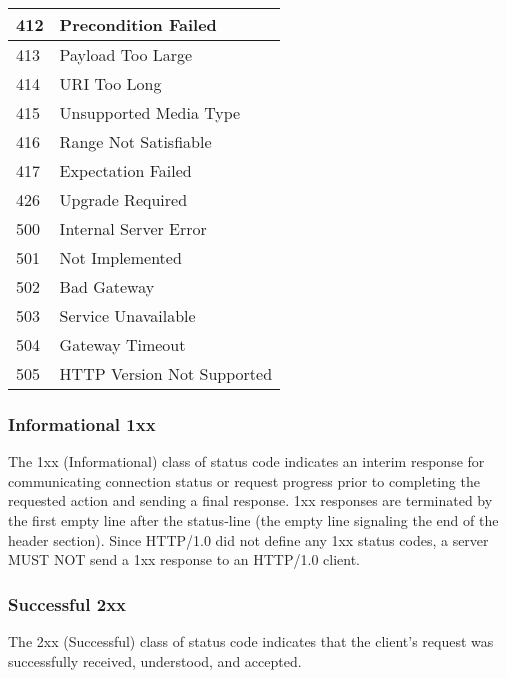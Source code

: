 \begin{longtable}{|l|l|}
   \\ \hline 412  & Precondition Failed           
   \\ \hline 413  & Payload Too Large             
   \\ \hline 414  & URI Too Long                  
   \\ \hline 415  & Unsupported Media Type        
   \\ \hline 416  & Range Not Satisfiable         
   \\ \hline 417  & Expectation Failed            
   \\ \hline 426  & Upgrade Required              
   \\ \hline 500  & Internal Server Error         
   \\ \hline 501  & Not Implemented               
   \\ \hline 502  & Bad Gateway                   
   \\ \hline 503  & Service Unavailable           
   \\ \hline 504  & Gateway Timeout               
   \\ \hline 505  & HTTP Version Not Supported    
   \\ \hline
\end{longtable}

   
   
   \subsubsection{Informational 1xx}

   The 1xx (Informational) class of status code indicates an interim
   response for communicating connection status or request progress
   prior to completing the requested action and sending a final
   response. 1xx responses are terminated by the first empty line after
   the status-line (the empty line signaling the end of the header
   section).  Since HTTP/1.0 did not define any 1xx status codes, a
   server MUST NOT send a 1xx response to an HTTP/1.0 client.

  


   \subsubsection{Successful 2xx}

   The 2xx (Successful) class of status code indicates that the client's
   request was successfully received, understood, and accepted.



